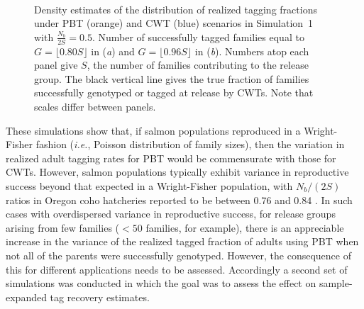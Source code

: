 \documentclass[11pt]{article}
\newcommand{\ie}{{\em i.e.},\xspace }
\begin{document}
\begin{figure}
\centering
\mbox{
	~~~~~
}
\caption{Density estimates of the distribution of realized tagging fractions under PBT (orange) and CWT (blue) scenarios
in Simulation~1 with $\frac{N_b}{2S} = 0.5$. Number of successfully tagged families
equal to $G = \lfloor0.80S\rfloor$ in ({\em a}) and $G = \lfloor0.96S\rfloor$ in ({\em b}).  Numbers
atop each panel give $S$, the number of families contributing to the release group. The black vertical line
gives the true fraction of families successfully genotyped or tagged at release by CWTs. Note that
scales differ between panels.}
\label{fig:Ne50}
\end{figure}
These simulations show that, if salmon populations reproduced in a Wright-Fisher fashion
(\ie Poisson distribution of family sizes), then the variation in
realized adult tagging rates for PBT would be commensurate with those for CWTs.  However, salmon populations
typically exhibit variance in reproductive success beyond that expected in a Wright-Fisher population, with
$N_b/(2S)$ ratios in  Oregon coho hatcheries reported to be between 0.76 and 0.84  \citet{Moyeretal2007}. 
 In such cases with overdispersed variance in reproductive success,
for release groups arising from few families ($<50$ families, for example),
there is an appreciable increase in the variance of the realized tagged fraction of adults using PBT when
not all of the parents were successfully genotyped.  However,
the consequence of this for different applications needs to be assessed. Accordingly a second set of simulations
was conducted in which the goal was to assess the effect on sample-expanded tag recovery estimates. 
\end{document}
